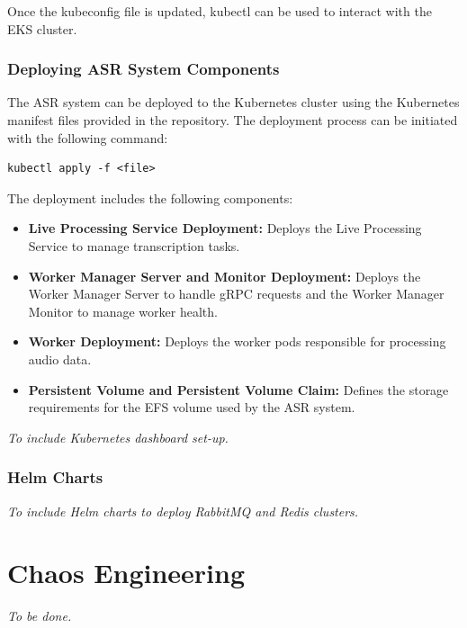 Once the kubeconfig file is updated, kubectl can be used to interact with the EKS cluster.

\subsubsection{Deploying ASR System Components}
The ASR system can be deployed to the Kubernetes cluster using the Kubernetes manifest files provided in the repository. The deployment process can be initiated with the following command:
\begin{verbatim}
kubectl apply -f <file>
\end{verbatim}

The deployment includes the following components:
\begin{itemize}
    \item \textbf{Live Processing Service Deployment:} Deploys the Live Processing Service to manage transcription tasks.
    \item \textbf{Worker Manager Server and Monitor Deployment:} Deploys the Worker Manager Server to handle gRPC requests and the Worker Manager Monitor to manage worker health.
    \item \textbf{Worker Deployment:} Deploys the worker pods responsible for processing audio data.
    \item \textbf{Persistent Volume and Persistent Volume Claim:}  Defines the storage requirements for the EFS  volume used by the ASR system.
\end{itemize}

\textit{To include Kubernetes dashboard set-up.}

\subsubsection{Helm Charts}
\textit{To include Helm charts to deploy RabbitMQ and Redis clusters.}

\section{Chaos Engineering}
\textit{To be done.}
